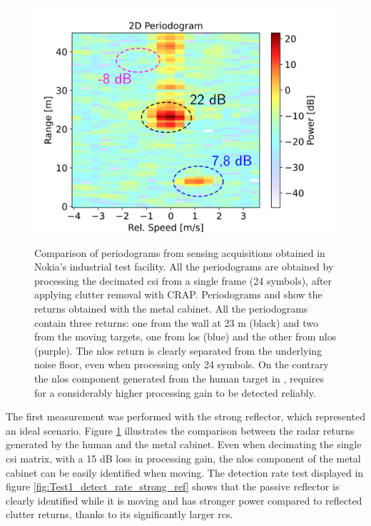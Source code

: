 \begin{figure}[H]
{		\includegraphics[scale=0.45]{Images/Test1/per_strong_ref/db_1frame_dec_CRAP_HUMAN_labelled_text22.png}
	}
	\caption[]{\small Comparison of periodograms from sensing acquisitions obtained in Nokia's industrial test facility.
		All the periodograms are obtained by processing the decimated \gls{csi} from a single frame (24 symbols), after applying clutter removal with CRAP.
		Periodograms  and  show the returns obtained with the metal cabinet. All the periodograms contain three returns: one from the wall at 23 m (black) and two from the moving targets, one from \gls{los} (blue) and the other from \gls{nlos} (purple). The \gls{nlos} return is clearly separated from the underlying noise floor, even when processing only 24 symbols. On the contrary the \gls{nlos} component generated from the human target in , requires for a considerably higher processing gain to be detected reliably.}
	\label{fig:Test1_metal-human_comparison}
	\end{figure}
The first measurement was performed with the strong reflector, which represented an ideal scenario. 
Figure \ref{fig:Test1_metal-human_comparison} illustrates the comparison between the radar returns generated by the human and the metal cabinet. 
Even when decimating the single \gls{csi} matrix, with a 15 dB loss in processing gain, the \gls{nlos} component of the metal cabinet can be easily identified when moving.
The detection rate test displayed in figure \ref{fig:Test1_detect_rate_strong_ref} shows that the passive reflector is clearly identified while it is moving and has stronger power compared to reflected clutter returns, thanks to its significantly larger \gls{rcs}.
